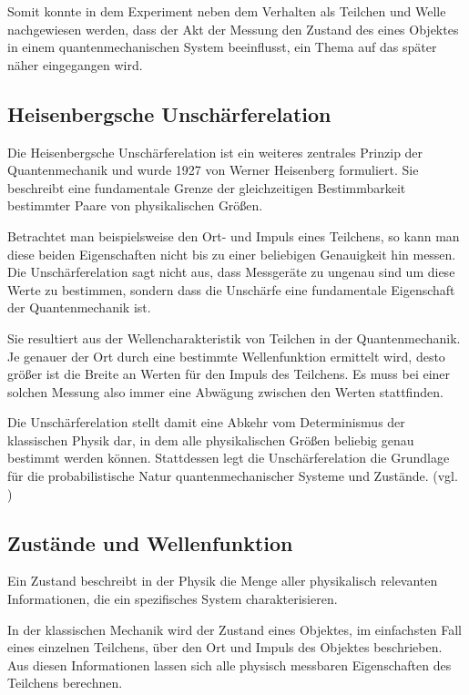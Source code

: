 Somit konnte in dem Experiment neben dem Verhalten als Teilchen und Welle nachgewiesen werden, dass der Akt der Messung den Zustand des eines Objektes in einem quantenmechanischen System beeinflusst, ein Thema auf das später näher eingegangen wird.

\subsection{Heisenbergsche Unschärferelation}
\label{Heisenbergsche Unschärferelation}

Die Heisenbergsche Unschärferelation ist ein weiteres zentrales Prinzip der Quantenmechanik und wurde 1927 von Werner Heisenberg formuliert. Sie beschreibt eine fundamentale Grenze der gleichzeitigen Bestimmbarkeit bestimmter Paare von physikalischen Größen.


Betrachtet man beispielsweise den Ort- und Impuls eines Teilchens, so kann man diese beiden Eigenschaften nicht bis zu einer beliebigen Genauigkeit hin messen. Die Unschärferelation sagt nicht aus, dass Messgeräte zu ungenau sind um diese Werte zu bestimmen, sondern dass die Unschärfe eine fundamentale Eigenschaft der Quantenmechanik ist.


Sie resultiert aus der Wellencharakteristik von Teilchen in der Quantenmechanik. Je genauer der Ort durch eine bestimmte Wellenfunktion ermittelt wird, desto größer ist die Breite an Werten für den Impuls des Teilchens. Es muss bei einer solchen Messung also immer eine Abwägung zwischen den Werten stattfinden. 


Die Unschärferelation stellt damit eine Abkehr vom Determinismus der klassischen Physik dar, in dem alle physikalischen Größen beliebig genau bestimmt werden können. Stattdessen legt die Unschärferelation die Grundlage für die probabilistische Natur quantenmechanischer Systeme und Zustände. (vgl. \cite[Ch. 1.6.3]{kasirajan_fundamentals_2021})

\subsection{Zustände und Wellenfunktion}
\label{Zustände und Wellenfunktion}

Ein Zustand beschreibt in der Physik die Menge aller physikalisch relevanten Informationen, die ein spezifisches System charakterisieren.


In der klassischen Mechanik wird der Zustand eines Objektes, im einfachsten Fall eines einzelnen Teilchens, über den Ort und Impuls des Objektes beschrieben. Aus diesen Informationen lassen sich alle physisch messbaren Eigenschaften des Teilchens berechnen.


